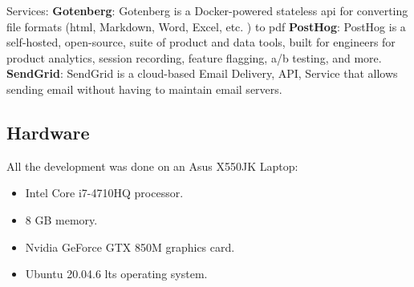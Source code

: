 \documentclass[../main.tex]{subfiles}
\begin{document}
\begin{outline}
 \1 Services:
    \2 \textbf{Gotenberg}: Gotenberg is a Docker-powered stateless \acrshort{api} for converting file formats (\acrshort{html}, Markdown, Word, Excel, etc. ) to \acrshort{pdf}\cite{gotenberg}
    \2 \textbf{PostHog}: PostHog is a self-hosted, open-source, suite of product and data tools, built for engineers for product analytics, session recording, feature flagging, a/b testing, and more.\cite{posthog}
    \2 \textbf{SendGrid}: SendGrid is a cloud-based Email Delivery, API, Service that allows sending email without having to maintain email servers.\cite{sendgrid}
\end{outline}
\newpage
\subsection{Hardware}
All the development was done on an Asus X550JK Laptop:
\begin{itemize}
    \item Intel Core i7-4710HQ processor.
    \item 8 GB memory.
    \item Nvidia GeForce GTX 850M graphics card.
    \item Ubuntu 20.04.6 \acrshort{lts} operating system.
\end{itemize}
\end{document}
